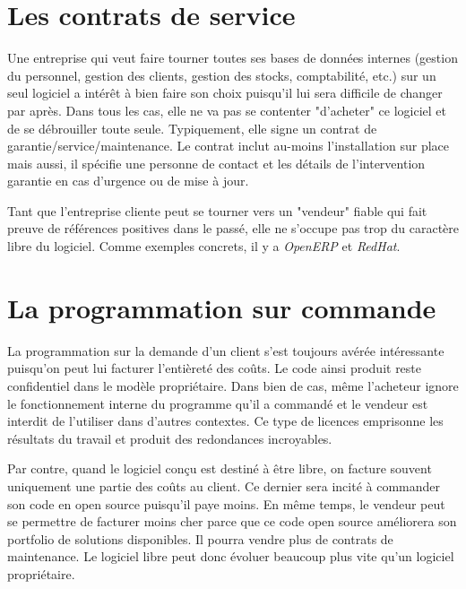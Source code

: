 \documentclass[10pt]{../fiche}
\begin{document}
\section*{Les contrats de service}
Une entreprise qui veut faire tourner toutes ses bases de données internes (gestion du personnel,
gestion des clients, gestion des stocks, comptabilité, etc.) sur un seul logiciel a intérêt à bien faire son choix puisqu'il lui sera difficile de changer par après.%
Dans tous les cas, elle ne va pas se contenter "d'acheter" ce logiciel et de se débrouiller toute seule.
Typiquement, elle signe un contrat de garantie/service/maintenance. %
Le contrat inclut au-moins l'installation sur place mais aussi, il spécifie une personne de contact et les détails de l'intervention garantie en cas d'urgence ou de mise à jour.

Tant que l'entreprise cliente peut se tourner vers un "vendeur" fiable qui fait preuve de références
positives dans le passé, elle ne s'occupe pas trop du caractère libre du logiciel.
Comme exemples concrets, il y a \textit{OpenERP} et \textit{RedHat}.

\section*{La programmation sur commande}
La programmation sur la demande d'un client %
s'est toujours avérée intéressante puisqu'on
peut lui facturer l'entièreté des coûts. Le code ainsi produit reste confidentiel dans le
modèle propriétaire. Dans bien de cas, même l'acheteur ignore le fonctionnement
interne du programme qu'il a commandé et le vendeur est interdit de l'utiliser dans d'autres contextes.
Ce type de licences emprisonne les résultats du travail et produit des redondances incroyables.

Par contre, quand le logiciel conçu est destiné à être libre, on facture souvent uniquement une partie
des coûts au client. Ce dernier sera incité à commander son code en open source puisqu'il paye moins. %
En même temps, le vendeur peut se permettre de facturer moins cher parce que ce code open source
améliorera son portfolio de solutions disponibles. Il pourra vendre plus de contrats de maintenance.
Le logiciel libre peut donc évoluer beaucoup plus vite qu'un logiciel propriétaire.
\end{document}
